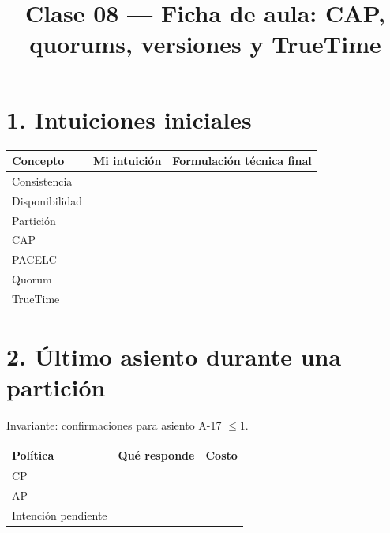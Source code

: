 \documentclass[variant=guia,cover=institutional,mode=print]{ua-engineering-v6-article}
\title{Clase 08 --- Ficha de aula: CAP, quorums, versiones y TrueTime}
\author{\UAProfessor}
\date{\UADate}
\begin{document}
\maketitle
\section{1. Intuiciones iniciales}
\begin{tabular}{p{}p{}p{}}
\toprule
Concepto & Mi intuición & Formulación técnica final \\
\midrule
Consistencia & \rule{0pt}{1cm} & \\
Disponibilidad & \rule{0pt}{1cm} & \\
Partición & \rule{0pt}{1cm} & \\
CAP & \rule{0pt}{1cm} & \\
PACELC & \rule{0pt}{1cm} & \\
Quorum & \rule{0pt}{1cm} & \\
TrueTime & \rule{0pt}{1cm} & \\
\bottomrule
\end{tabular}

\newpage
\section{2. Último asiento durante una partición}
Invariante: confirmaciones para asiento A-17 $\leq1$.

\begin{center}
\end{center}

\begin{tabular}{p{}p{}p{}}
\toprule
Política & Qué responde & Costo \\
\midrule
CP & \rule{0pt}{1.2cm} & \\
AP & \rule{0pt}{1.2cm} & \\
Intención pendiente & \rule{0pt}{1.2cm} & \\
\bottomrule
\end{tabular}
\end{document}
